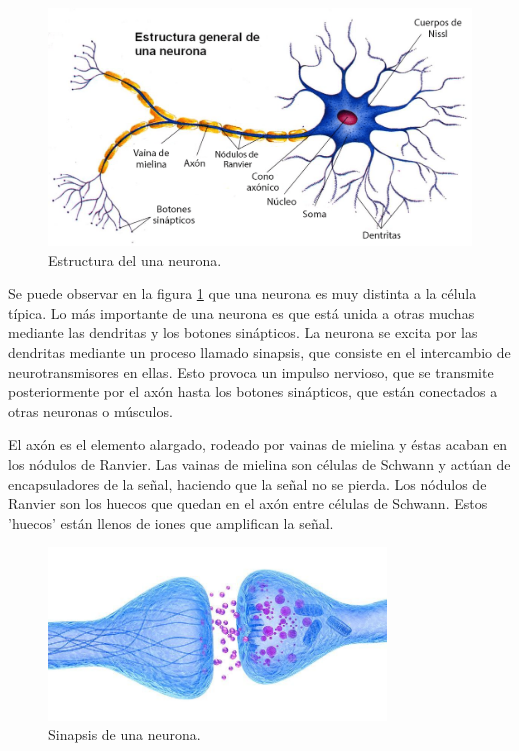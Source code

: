 \documentclass[12pt]{book}
\numberwithin{equation}{section}
\begin{document}
\begin{figure}[h]
    \centering
    \includegraphics[width=1\textwidth]{estructura_general_neurona.png}
    \caption{Estructura del una neurona.}
    \label{fig:neuronareal}
\end{figure}

Se puede observar en la figura \ref{fig:neuronareal} que una neurona es muy distinta a la célula típica. Lo más importante de una neurona es que está unida a otras muchas mediante las dendritas y los botones sinápticos. La neurona se excita por las dendritas mediante un proceso llamado sinapsis, que consiste en el intercambio de neurotransmisores en ellas. Esto provoca un impulso nervioso, que se transmite posteriormente por el axón hasta los botones sinápticos, que están conectados a otras neuronas o músculos.

El axón es el elemento alargado, rodeado por vainas de mielina y éstas acaban en los nódulos de Ranvier. Las vainas de mielina son células de Schwann y actúan de encapsuladores de la señal, haciendo que la señal no se pierda. Los nódulos de Ranvier son los huecos que quedan en el axón entre células de Schwann. Estos 'huecos' están llenos de iones que amplifican la señal.

\begin{figure}[h]
    \centering
    \includegraphics[width=0.8\textwidth]{sinapsis.jpg}
    \caption{Sinapsis de una neurona.}
    \label{fig:mesh2}
\end{figure}
\end{document}
